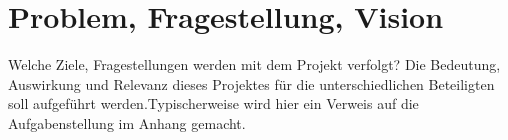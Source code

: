 \chapter{Problem, Fragestellung, Vision}


Welche Ziele, Fragestellungen werden mit dem Projekt verfolgt? Die Bedeutung, Auswirkung und Relevanz dieses Projektes für die unterschiedlichen Beteiligten soll aufgeführt werden.Typischerweise wird hier ein Verweis auf die Aufgabenstellung im Anhang gemacht.